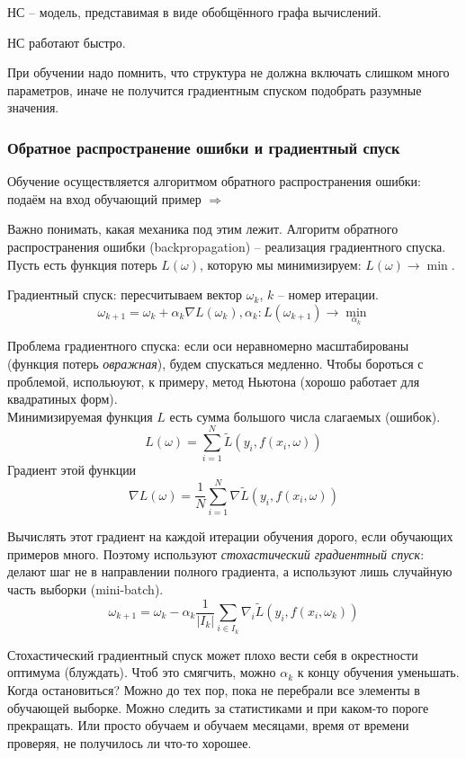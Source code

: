 \documentclass[main.tex]{subfiles}
\begin{document}
НС -- модель, представимая в виде обобщённого графа вычислений.

НС работают быстро.

При обучении надо помнить, что структура не должна включать слишком много параметров, иначе не получится градиентным спуском подобрать разумные значения.

\subsubsection{Обратное распространение ошибки и градиентный спуск}

Обучение осуществляется алгоритмом обратного распространения ошибки:
подаём на вход обучающий пример $ \Rightarrow $ %

Важно понимать, какая механика под этим лежит.
Алгоритм обратного распространения ошибки (backpropagation) -- реализация градиентного спуска. \\

Пусть есть функция потерь $ L(\omega) $, которую мы минимизируем: $ L(\omega) \to \min $.

Градиентный спуск: пересчитываем вектор $\omega_k$, $k$ -- номер итерации.  
$$ \omega_{k+1} = \omega_k + \alpha_k \nabla L(\omega_k), \alpha_k : L(\omega_{k+1}) \to \min_{\alpha_k} $$

Проблема градиентного спуска: если оси неравномерно масштабированы (функция потерь \emph{овражная}), будем спускаться медленно.
Чтобы бороться с проблемой, испольюуют, к примеру, метод Ньютона (хорошо работает для квадратиных форм). \\

Минимизируемая функция $L$ есть сумма большого числа слагаемых (ошибок).
$$ L(\omega) = \sum_{i=1}^{N} \tilde L (y_i, f(x_i, \omega)) $$
Градиент этой функции
$$ \nabla L(\omega) = \frac{1}{N} \sum_{i=1}^{N} \nabla \tilde{L}(y_i, f(x_i, \omega)) $$

Вычислять этот градиент на каждой итерации обучения дорого, если обучающих примеров много.
Поэтому используют \emph{стохастический градиентный спуск}: делают шаг не в направлении полного градиента, а используют лишь случайную часть выборки (mini-batch).
$$ \omega_{k+1} = \omega_k - \alpha_k \frac{1}{|I_k|} \sum_{i \in I_k} \nabla_i \tilde L (y_i, f(x_i, \omega_k)) $$

Стохастический градиентный спуск может плохо вести себя в окрестности оптимума (блуждать).
Чтоб это смягчить, можно $\alpha_k$ к концу обучения уменьшать. \\

Когда остановиться?
Можно до тех пор, пока не перебрали все элементы в обучающей выборке.
Можно следить за статистиками и при каком-то пороге прекращать.
Или просто обучаем и обучаем месяцами, время от времени проверяя, не получилось ли что-то хорошее.
\end{document}
